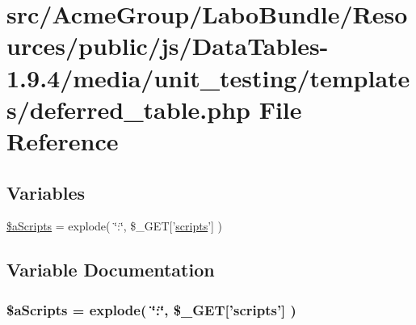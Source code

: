 \hypertarget{deferred__table_8php}{\section{src/\+Acme\+Group/\+Labo\+Bundle/\+Resources/public/js/\+Data\+Tables-\/1.9.4/media/unit\+\_\+testing/templates/deferred\+\_\+table.php File Reference}
\label{deferred__table_8php}
}
\subsection*{Variables}
\begin{DoxyCompactItemize}
\item 
\hyperlink{deferred__table_8php_a3e8e1608000c9afdd05327fc2b06b056}{\$a\+Scripts} = explode( \char`\"{}\+:\char`\"{}, \$\+\_\+\+G\+E\+T\mbox{[}'\hyperlink{tinymce_8jquery_8dev_8js_a09066d4d580eeec222f858d588b4cdef}{scripts}'\mbox{]} )
\end{DoxyCompactItemize}


\subsection{Variable Documentation}
\hypertarget{deferred__table_8php_a3e8e1608000c9afdd05327fc2b06b056}{
\subsubsection[{\$a\+Scripts}]{\setlength{\rightskip}{0pt plus 5cm}\$a\+Scripts = explode( \char`\"{}\+:\char`\"{}, \$\+\_\+\+G\+E\+T\mbox{[}'{\bf scripts}'\mbox{]} )}}\label{deferred__table_8php_a3e8e1608000c9afdd05327fc2b06b056}

